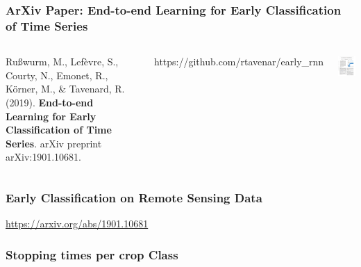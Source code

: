 \documentclass[%
  aspectratio=169,
  9pt,
  USenglish,
  titlegraphic, %
  progressbar,
]{beamer}
\begin{document}
\begin{frame}
\frametitle{ArXiv Paper: End-to-end Learning for Early Classification of Time Series}

\begin{columns}



Rußwurm, M., Lefèvre, S., Courty, N., Emonet, R., Körner, M., \& Tavenard, R. (2019).\textbf{ End-to-end Learning for Early Classification of Time Series}. arXiv preprint arXiv:1901.10681.

\vspace{1em}
https://github.com/rtavenar/early\_rnn


\includegraphics[width=4cm]{images/elects_arxiv}

\end{columns}

\end{frame}



%	
%	
%	


\begin{frame}
\frametitle{Early Classification on Remote Sensing Data}


\url{https://arxiv.org/abs/1901.10681}


\end{frame}

\begin{frame}
\frametitle{Stopping times per crop Class}



\end{frame}
\end{document}
